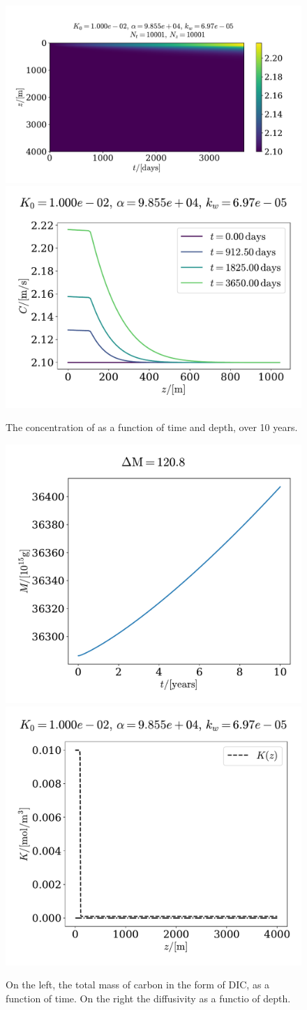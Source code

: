 \documentclass{article}
\begin{document}
    \begin{figure}[H]
        \centering
        \includegraphics[width=.56\textwidth]{../plots/prob3}
        \includegraphics[width=.43\textwidth]{../plots/prob3_i}
        \caption{The concentration of   as a function of time and depth, over 10 years.}
        \label{prob3}
    \end{figure}

    \begin{figure}[H]
        \centering
        \includegraphics[width=.45\textwidth]{../plots/prob3_M}
        \includegraphics[width=.45\textwidth]{../plots/prob3_K}
        \caption{On the left, the total mass of carbon in the form of DIC, as a function of time. On the right the diffusivity as a functio of depth.}
        \label{prob3 mass}
    \end{figure}

    \printbibliography
\end{document}
